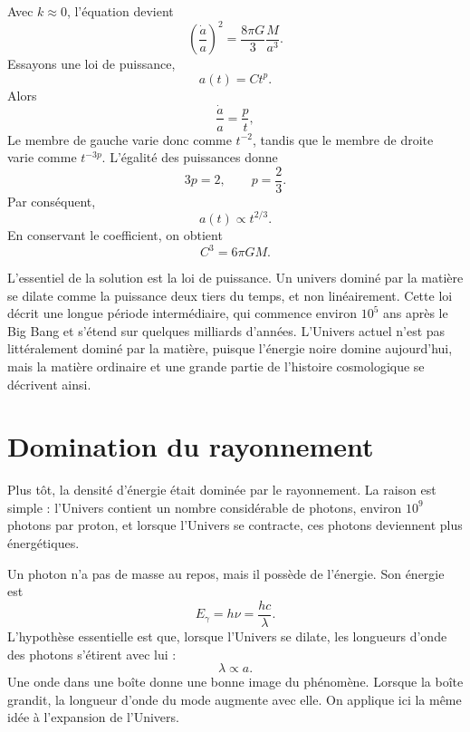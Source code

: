 Avec \(k\approx 0\), l’équation devient
\begin{equation}
\left(\frac{\dot a}{a}\right)^2=\frac{8\pi G}{3}\frac{M}{a^3}.
\end{equation}
Essayons une loi de puissance,
\begin{equation}
a(t)=Ct^p.
\end{equation}
Alors
\begin{equation}
\frac{\dot a}{a}=\frac{p}{t},
\end{equation}
Le membre de gauche varie donc comme \(t^{-2}\), tandis que le membre de droite varie comme \(t^{-3p}\). L’égalité des puissances donne
\begin{equation}
3p=2,
\qquad
p=\frac{2}{3}.
\end{equation}
Par conséquent,
\begin{equation}
a(t)\propto t^{2/3}.
\end{equation}
En conservant le coefficient, on obtient
\begin{equation}
C^3=6\pi G M.
\end{equation}

L’essentiel de la solution est la loi de puissance. Un univers dominé par la matière se dilate comme la puissance deux tiers du temps, et non linéairement. Cette loi décrit une longue période intermédiaire, qui commence environ \(10^5\) ans après le Big Bang et s’étend sur quelques milliards d’années. L’Univers actuel n’est pas littéralement dominé par la matière, puisque l’énergie noire domine aujourd’hui, mais la matière ordinaire et une grande partie de l’histoire cosmologique se décrivent ainsi.

\section{Domination du rayonnement}

Plus tôt, la densité d’énergie était dominée par le rayonnement. La raison est simple : l’Univers contient un nombre considérable de photons, environ \(10^9\) photons par proton, et lorsque l’Univers se contracte, ces photons deviennent plus énergétiques.

Un photon n’a pas de masse au repos, mais il possède de l’énergie. Son énergie est
\begin{equation}
E_\gamma=h\nu=\frac{hc}{\lambda}.
\end{equation}
L’hypothèse essentielle est que, lorsque l’Univers se dilate, les longueurs d’onde des photons s’étirent avec lui :
\begin{equation}
\lambda\propto a.
\end{equation}
Une onde dans une boîte donne une bonne image du phénomène. Lorsque la boîte grandit, la longueur d’onde du mode augmente avec elle. On applique ici la même idée à l’expansion de l’Univers.

